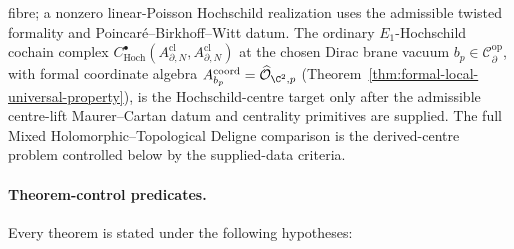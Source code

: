 \documentclass[11pt]{memoir}
\begin{document}
fibre; a nonzero linear-Poisson Hochschild realization uses the
admissible twisted formality and Poincar\'e--Birkhoff--Witt datum.  The
ordinary \(E_1\)-Hochschild cochain complex
\(C^\bullet_{\mathrm{Hoch}}(A^{\mathrm{cl}}_{\partial,N},
A^{\mathrm{cl}}_{\partial,N})\) at the chosen Dirac brane vacuum
\(b_p\in\mathcal{C}^{\mathrm{op}}_\partial\), with formal coordinate
algebra
\(A^{\mathrm{coord}}_{b_p}=\widehat{\mathcal O}_{\C^2,p}\)
(Theorem~\ref{thm:formal-local-universal-property}), is the
Hochschild-centre target only after the admissible centre-lift
Maurer--Cartan datum and centrality primitives are supplied.  The full
Mixed Holomorphic--Topological Deligne comparison is the
derived-centre problem controlled below by the supplied-data criteria.

\paragraph{Theorem-control predicates.}
Every theorem is stated under the following
hypotheses:
\end{document}
